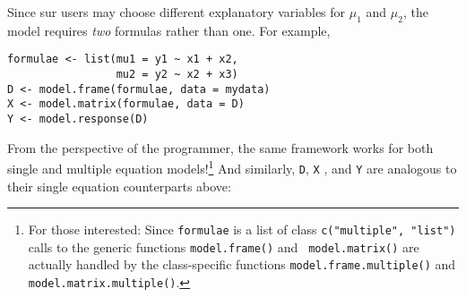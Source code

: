\documentclass[oneside,letterpaper,12pt]{article}
\begin{document}
Since {\sc sur} users may choose different explanatory variables for
$\mu_1$ and $\mu_2$, the model requires \emph{two} formulas rather
than one.  For example,
\begin{verbatim}
formulae <- list(mu1 = y1 ~ x1 + x2,
                 mu2 = y2 ~ x2 + x3)
D <- model.frame(formulae, data = mydata)
X <- model.matrix(formulae, data = D)
Y <- model.response(D)
\end{verbatim}
From the perspective of the programmer, the same framework works for
both single and multiple equation models!\footnote{For those
interested: Since {\tt formulae} is a list of class {\tt c("multiple",
"list")} calls to the generic functions {\tt model.frame()} and {\tt
model.matrix()} are actually handled by the class-specific functions
{\tt model.frame.multiple()} and {\tt model.matrix.multiple()}.}  And
similarly, {\tt D}, {\tt X} , and {\tt Y} are analogous to their
single equation counterparts above:
\end{document}
